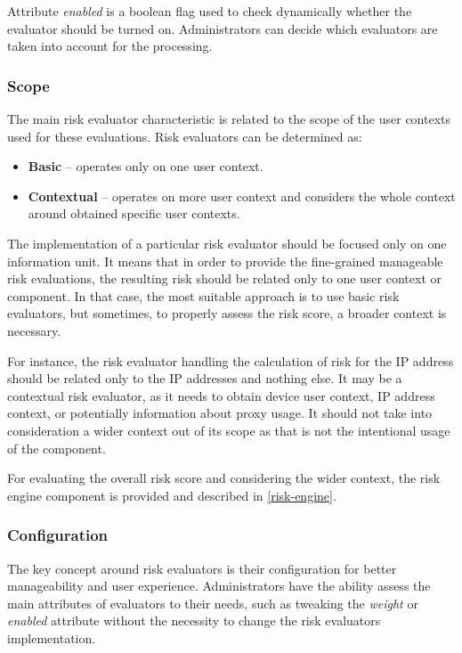 Attribute \textit{enabled} is a boolean flag used to check dynamically whether
the evaluator should be turned on.
Administrators can decide which evaluators are taken into account for the processing.

\subsubsection{Scope}
The main risk evaluator characteristic is related to the scope of the user contexts used for these evaluations.
\newline
\newline
Risk evaluators can be determined as:

\begin{itemize}
    \item \textbf{Basic} -- operates only on one user context.
    \item \textbf{Contextual} -- operates on more user context and considers the whole context around obtained specific user contexts.
\end{itemize}

The implementation of a particular risk evaluator should be focused only on one information unit.
It means that in order to provide the fine-grained manageable risk evaluations, the resulting risk should be related only to one user context or component.
In that case, the most suitable approach is to use basic risk evaluators, but sometimes, to properly assess the risk score, a broader context is necessary.

For instance, the risk evaluator handling the calculation of risk for the IP address should be related only to the IP addresses and nothing else.
It may be a contextual risk evaluator, as it needs to obtain device user context, IP address context, or potentially information about proxy usage.
It should not take into consideration a wider context out of its scope as that is not the intentional usage of the component.

For evaluating the overall risk score and considering the wider context, the risk engine component is provided and described in \ref{risk-engine}.

\newpage

\subsubsection{Configuration}
The key concept around risk evaluators is their configuration for better manageability and user experience.
Administrators have the ability assess the main attributes of evaluators to their needs, such as tweaking the \textit{weight} or \textit{enabled} attribute without the necessity to change the risk evaluators implementation.

